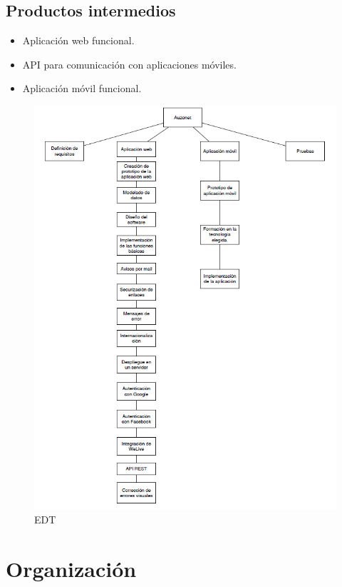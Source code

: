 \documentclass{DeustoFDP}
\begin{document}
\subsection{Productos intermedios}
\begin{itemize}
  \item Aplicación web funcional.
  \item API para comunicación con aplicaciones móviles.
  \item Aplicación móvil funcional.
\end{itemize}

\begin{figure}
    \centering
    \includegraphics{fig/EDT}
    \caption{EDT}\label{fig:edt}
\end{figure}
\restoregeometry

\section{Organización}
\end{document}
